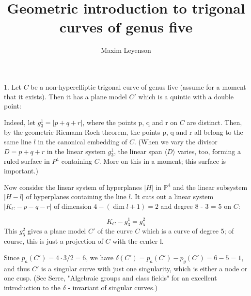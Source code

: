 \documentclass{amsart} %
\newcommand{\<}{\langle }
\renewcommand{\>}{\rangle }
\begin{document}

\title{Geometric introduction to trigonal curves of genus five}
\author{Maxim Leyenson}
\date{}   %

\maketitle





1. Let $C$ be a non-hyperelliptic trigonal  curve of genus five (assume for a moment that it
exists). Then it has a plane model $C'$ which is a quintic with a double point:

Indeed, let $g_3^1 = |p + q + r|$, where the points p, q and r on $C$ are distinct.
Then, by the geometric Riemann-Roch theorem, the points p, q and r 
all belong to the same line $l$ in the canonical embedding of $C$. (When we vary the divisor
$D = p + q + r$ in the linear system $g_3^1$, the linear span $\<D\>$ varies, too, forming a ruled surface
in $P^4$ containing $C$. More on this in a moment; this surface is important.)
  
Now consider the linear system of hyperplanes $|H|$ in $\mathbb{P}^4$ and the linear subsystem
$|H - l|$ of hyperplanes containing the line $l$. It cuts out a linear system  
$|K_C - p - q - r| $ of dimension $4 - ( \dim l + 1) = 2$ and degree 8 - 3 = 5 on $C$:

\[
    K_C - g_3^1 = g_5^2
\]
This $g_5^2$ gives a plane model $C'$ of the curve $C$ which is a curve of degree 5;
of course, this is just a projection of $C$ with the center l.

Since $p_a(C') = 4 \cdot 3 / 2 = 6$, we have $ \delta(C') = p_a(C') - p_g(C') = 
6 - 5 = 1$, and thus $C'$ is a singular curve with just one singularity, which is either a node or one cusp.
(See Serre, "Algebraic groups and class fields" for an excellent introduction to the $\delta$ - invariant of
singular curves.)


\vspace{10mm} %
\end{document}
